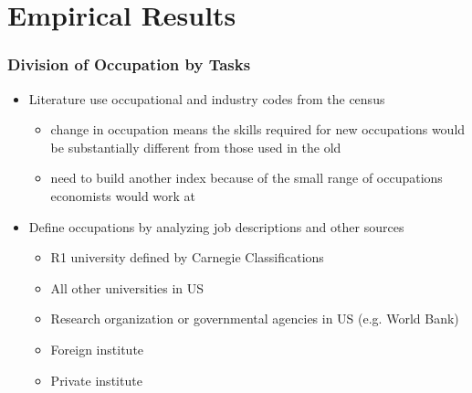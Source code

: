 \documentclass[10pt,svgnames,fragile]{beamer}
\begin{document}
{
	\AtBeginSection{}
	\section{Empirical Results}
	\begin{frame}[label = job_des]
		\frametitle{Division of Occupation by Tasks}
		\begin{itemize}
			\item Literature use occupational and industry codes from the census
			\begin{itemize}
				\vspace{1.5 mm}
				\item change in occupation means the skills required for new occupations would be substantially different from those used in the old 
				\vspace{1.5 mm}
				\item need to build another index because of the small range of occupations economists would work at
			\end{itemize}
			\vfill
			\item Define occupations  by analyzing job descriptions and other sources
			\begin{itemize}
				\vspace{1.5 mm}
				\item R1 university defined by {\small Carnegie Classifications}
				\vspace{1.5 mm}
				\item All other universities in US
				\vspace{1.5 mm}
				\item Research organization or governmental agencies in US (e.g. World Bank)
				\vspace{1.5 mm}
				\item Foreign institute
				\vspace{1.5 mm}
				\item Private institute\\
				\vspace{1.5 mm}
				\hyperlink{NLP}{}
			\end{itemize}
			\vfill
		\end{itemize}
	\end{frame}
	

}
\end{document}

